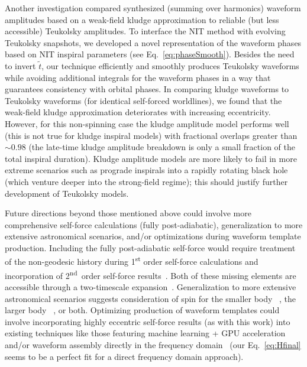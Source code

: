 \documentclass[aps,prd,twocolumn,showpacs,notitlepage,eqsecnum,
superscriptaddress,nofootinbib]{revtex4-1}
\begin{document}
Another investigation compared synthesized (summing over harmonics) waveform amplitudes based on a weak-field kludge approximation to reliable (but less accessible) Teukolsky amplitudes. To interface the NIT method with evolving Teukolsky snapshots, we developed a novel representation of the waveform phases based on NIT inspiral parameters (see Eq.~\eqref{eq:phaseSmooth}). Besides the need to invert $\tilde{t}$, our technique efficiently and smoothly produces Teukolsky waveforms while avoiding additional integrals for the waveform phases in a way that guarantees consistency with orbital phases. In comparing kludge waveforms to Teukolsky waveforms (for identical self-forced worldlines), we found that the weak-field kludge approximation deteriorates with increasing eccentricity. However, for this non-spinning case the kludge amplitude model performs well (this is not true for kludge inspiral models) with fractional overlaps greater than $\sim 0.98$ (the late-time kludge amplitude breakdown is only a small fraction of the total inspiral duration). Kludge amplitude models are more likely to fail in more extreme scenarios such as prograde inspirals into a rapidly rotating black hole (which venture deeper into the strong-field regime); this should justify further development of Teukolsky models. 

Future directions beyond those mentioned above could involve more comprehensive self-force calculations (fully post-adiabatic), generalization to more extensive astronomical scenarios, and/or optimizations during waveform template production. Including the fully post-adiabatic self-force would require treatment of the non-geodesic history during 1\textsuperscript{st} order self-force calculations and incorporation of 2\textsuperscript{nd}~order self-force results~\cite{PounETC20,warburton2021gravitationalwave}. Both of these missing elements are accessible through a two-timescale expansion~\cite{HindFlan08,Miller_2021,pound2021black}. Generalization to more extensive astronomical scenarios suggests consideration of spin for the smaller body ~\cite{BurkKhan15,Ruangsri_2016,WarbOsbu17,Piovano_2020}, the larger body ~\cite{WarbBara11,Vand16,Vand18,NasiOsbu19,nasipak2021resonant,Lynch}, or both. Optimizing production of waveform templates could involve incorporating highly eccentric self-force results (as with this work) into existing techniques like those featuring machine learning + GPU acceleration~\cite{Chua_2021,katz2021fastemriwaveforms} and/or waveform assembly directly in the frequency domain~\cite{Hughes_2021} (our Eq.~\eqref{eq:Hfinal} seems to be a perfect fit for a direct frequency domain approach).
\end{document}

